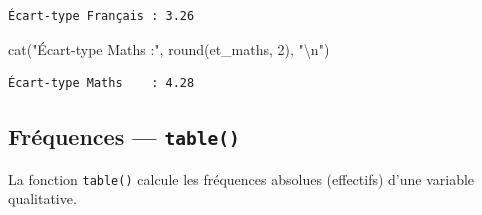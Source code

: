 \documentclass[
  french,
  11pt,
  a4paper,
]{article}
\newenvironment{Shaded}{}{}
\newcommand{\CommentTok}[1]{\textcolor[rgb]{0.42,0.45,0.49}{#1}}
\newcommand{\DecValTok}[1]{\textcolor[rgb]{0.00,0.36,0.77}{#1}}
\newcommand{\FunctionTok}[1]{\textcolor[rgb]{0.44,0.26,0.76}{#1}}
\newcommand{\NormalTok}[1]{\textcolor[rgb]{0.14,0.16,0.18}{#1}}
\newcommand{\OtherTok}[1]{\textcolor[rgb]{0.44,0.26,0.76}{#1}}
\newcommand{\SpecialCharTok}[1]{\textcolor[rgb]{0.00,0.36,0.77}{#1}}
\newcommand{\StringTok}[1]{\textcolor[rgb]{0.01,0.18,0.38}{#1}}
\begin{document}
\begin{Shaded}
\end{Shaded}

\begin{verbatim}
Écart-type Français : 3.26 
\end{verbatim}

\begin{Shaded}
\begin{Highlighting}[]
\FunctionTok{cat}\NormalTok{(}\StringTok{"Écart{-}type Maths    :"}\NormalTok{, }\FunctionTok{round}\NormalTok{(et\_maths, }\DecValTok{2}\NormalTok{), }\StringTok{"}\SpecialCharTok{\textbackslash{}n}\StringTok{"}\NormalTok{)}
\end{Highlighting}
\end{Shaded}

\begin{verbatim}
Écart-type Maths    : 4.28 
\end{verbatim}

\subsection{\texorpdfstring{Fréquences ---
\texttt{table()}}{Fréquences --- table()}}\label{fruxe9quences-table}

La fonction \texttt{table()} calcule les fréquences absolues (effectifs)
d'une variable qualitative.

\begin{Shaded}
\end{Shaded}
\end{document}
